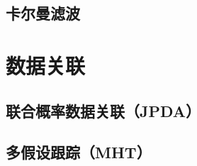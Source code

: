 \begin{example}

\end{example}

\subsection{卡尔曼滤波}

\section{数据关联}
\subsection{联合概率数据关联（JPDA）}
\subsection{多假设跟踪（MHT）}
